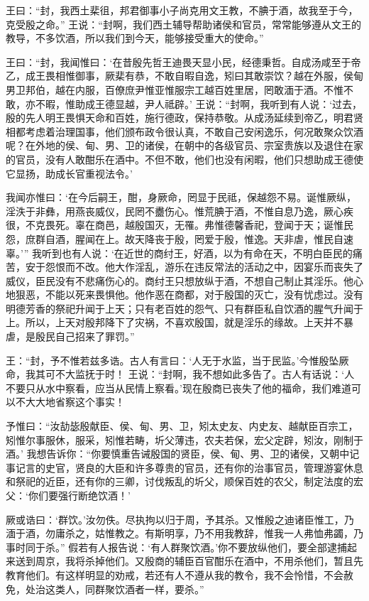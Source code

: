 \documentclass[a4paper,12pt,UTF8,twoside]{ctexbook}
\begin{document}
王曰：“封，我西土棐徂，邦君御事小子尚克用文王教，不腆于酒，故我至于今，克受殷之命。”
王说：“封啊，我们西土辅导帮助诸侯和官员，常常能够遵从文王的教导，不多饮酒，所以我们到今天，能够接受重大的使命。”

王曰：“封，我闻惟曰：‘在昔殷先哲王迪畏天显小民，经德秉哲。自成汤咸至于帝乙，成王畏相惟御事，厥棐有恭，不敢自暇自逸，矧曰其敢崇饮？越在外服，侯甸男卫邦伯，越在内服，百僚庶尹惟亚惟服宗工越百姓里居，罔敢湎于酒。不惟不敢，亦不暇，惟助成王德显越，尹人祗辟。’
王说：“封啊，我听到有人说：‘过去，殷的先人明王畏惧天命和百姓，施行德政，保持恭敬。从成汤延续到帝乙，明君贤相都考虑着治理国事，他们颁布政令很认真，不敢自己安闲逸乐，何况敢聚众饮酒呢？在外地的侯、甸、男、卫的诸侯，在朝中的各级官员、宗室贵族以及退住在家的官员，没有人敢酣乐在酒中。不但不敢，他们也没有闲暇，他们只想助成王德使它显扬，助成长官重视法令。’

我闻亦惟曰：‘在今后嗣王，酣，身厥命，罔显于民祗，保越怨不易。诞惟厥纵，淫泆于非彝，用燕丧威仪，民罔不衋伤心。惟荒腆于酒，不惟自息乃逸，厥心疾很，不克畏死。辜在商邑，越殷国灭，无罹。弗惟德馨香祀，登闻于天；诞惟民怨，庶群自酒，腥闻在上。故天降丧于殷，罔爱于殷，惟逸。天非虐，惟民自速辜。’”
我听到也有人说：‘在近世的商纣王，好酒，以为有命在天，不明白臣民的痛苦，安于怨恨而不改。他大作淫乱，游乐在违反常法的活动之中，因宴乐而丧失了威仪，臣民没有不悲痛伤心的。商纣王只想放纵于酒，不想自己制止其淫乐。他心地狠恶，不能以死来畏惧他。他作恶在商都，对于殷国的灭亡，没有忧虑过。没有明德芳香的祭祀升闻于上天；只有老百姓的怨气、只有群臣私自饮酒的腥气升闻于上。所以，上天对殷邦降下了灾祸，不喜欢殷国，就是淫乐的缘故。上天并不暴虐，是殷民自己招来了罪罚。”

王：“封，予不惟若兹多诰。古人有言曰：‘人无于水监，当于民监。’今惟殷坠厥命，我其可不大监抚于时！
王说：“封啊，我不想如此多告了。古人有话说：‘人不要只从水中察看，应当从民情上察看。’现在殷商已丧失了他的福命，我们难道可以不大大地省察这个事实！

予惟曰：“汝劼毖殷献臣、侯、甸、男、卫，矧太史友、内史友、越献臣百宗工，矧惟尔事服休，服采，矧惟若畴，圻父薄违，农夫若保，宏父定辟，矧汝，刚制于酒。’
我想告诉你：“你要慎重告诫殷国的贤臣，侯、甸、男、卫的诸侯，又朝中记事记言的史官，贤良的大臣和许多尊贵的官员，还有你的治事官员，管理游宴休息和祭祀的近臣，还有你的三卿，讨伐叛乱的圻父，顺保百姓的农父，制定法度的宏父：‘你们要强行断绝饮酒！’

厥或诰曰：‘群饮。’汝勿佚。尽执拘以归于周，予其杀。又惟殷之迪诸臣惟工，乃湎于酒，勿庸杀之，姑惟教之。有斯明享，乃不用我教辞，惟我一人弗恤弗蠲，乃事时同于杀。”
假若有人报告说：‘有人群聚饮酒。’你不要放纵他们，要全部逮捕起来送到周京，我将杀掉他们。又殷商的辅臣百官酣乐在酒中，不用杀他们，暂且先教育他们。有这样明显的劝戒，若还有人不遵从我的教令，我不会怜惜，不会赦免，处治这类人，同群聚饮酒者一样，要杀。”
\end{document}
